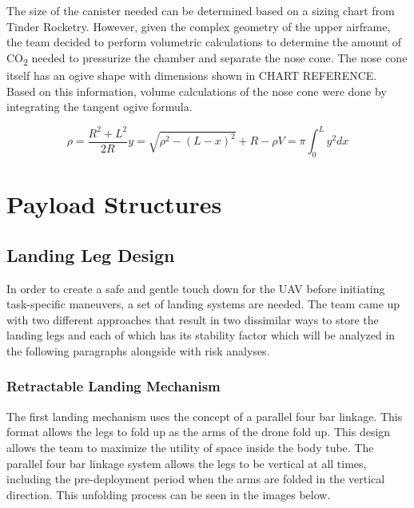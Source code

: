         The size of the canister needed can be determined based on a sizing chart from Tinder Rocketry. However, given the complex geometry of the upper airframe, the team decided to perform volumetric calculations to determine the amount of CO\textsubscript{2} needed to pressurize the chamber and separate the nose cone. The nose cone itself has an ogive shape with dimensions shown in CHART REFERENCE.  Based on this information, volume calculations of the nose cone were done by integrating the tangent ogive formula.

        \begin{subequations}\label{parachute}
            \begin{equation}
                \rho = \frac{R^2 + L^2}{2 R}
            \end{equation}
            \begin{equation}
                y = \sqrt{\rho^2 - (L - x)^2} + R - \rho
            \end{equation}
            \begin{equation}
                V = \pi \int_{0}^{L} y^2 dx
            \end{equation}
        \end{subequations}
\section{Payload Structures}\label{PL:Tradeoffs:Structures}
	\subsection{Landing Leg Design}
		In order to create a safe and gentle touch down for the UAV before initiating task-specific maneuvers, a set of landing systems are needed. The team came up with two different approaches that result in two dissimilar ways to store the landing legs and each of which has its stability factor which will be analyzed in the following paragraphs alongside with risk analyses.
		\subsubsection{Retractable Landing Mechanism}
			The first landing mechanism uses the concept of a parallel four bar linkage. This format allows the legs to fold up as the arms of the drone fold up. This design allows the team to maximize the utility of space inside the body tube. The parallel four bar linkage system allows the legs to be vertical at all times, including the pre-deployment period when the arms are folded in the vertical direction. This unfolding process can be seen in the images below.

